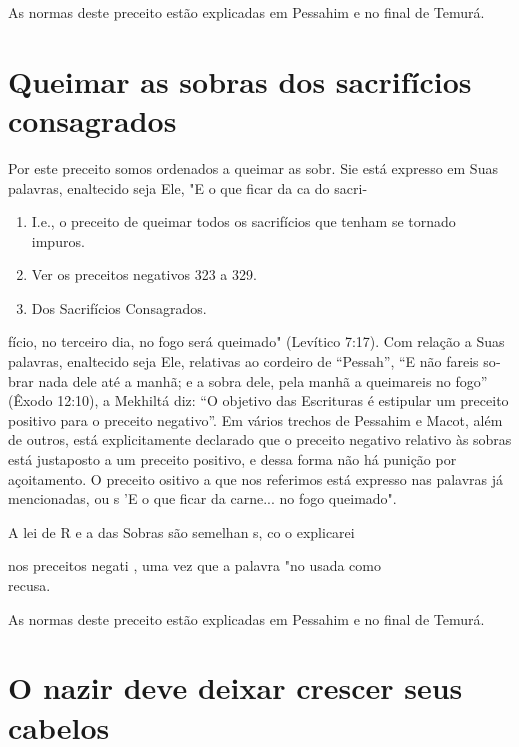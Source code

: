 As normas deste preceito estão explicadas em Pessahim e no final de
Temurá.

\section{Queimar as sobras dos sacrifícios consagrados}

Por este preceito somos ordenados a queimar as sobr. Sie está expresso
em Suas palavras, enaltecido seja Ele, "E o que ficar da ca do sacri-


\begin{enumerate}
\def\labelenumi{\arabic{enumi}.}
\setcounter{enumi}{118}
\item
 
 I.e., o preceito de queimar todos os sacrifícios que tenham se tornado
 impuros.
 
\item
 
 Ver os preceitos negativos 323 a 329.
 
\item
 
 Dos Sacrifícios Consagrados.
 
\end{enumerate}




fício, no terceiro dia, no fogo será queimado" (Levítico 7:17). Com
relação a Suas palavras, enaltecido seja Ele, relativas ao cordeiro de
``Pessah'', ``E não fareis so­brar nada dele até a manhã; e a sobra dele,
pela manhã a queimareis no fogo'' (Êxodo 12:10), a Mekhiltá diz: ``O
objetivo das Escrituras é estipular um preceito positivo para o preceito
negativo''. Em vários trechos de Pessahim e Macot, além de outros, está
explicitamente declarado que o preceito negativo relativo às so­bras
está justaposto a um preceito positivo, e dessa forma não há punição por
açoitamento. O preceito ositivo a que nos referimos está expresso nas
palavras já mencionadas, ou s 'E o que ficar da carne... no fogo
queimado".

A lei de R e a das Sobras são semelhan s, co o explicarei

nos preceitos negati , uma vez que a palavra "no usada como\\
recusa.

As normas deste preceito estão explicadas em Pessahim e no final de
Temurá.

\section{O nazir deve deixar crescer seus cabelos}

